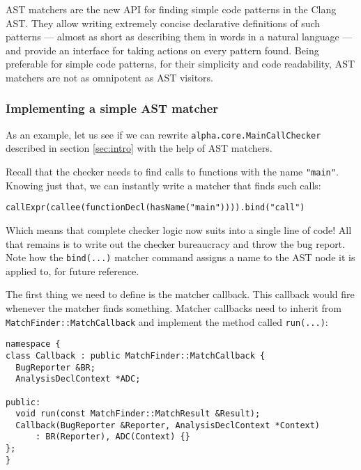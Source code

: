 \documentclass[a4paper,12pt]{article}
\newenvironment{nobr}{\begin{minipage}{\textwidth}\setlength\parskip{1em}
}{\end{minipage}\ignorespacesafterend}
\begin{document}
AST matchers are the new API for finding simple code patterns in the Clang AST. They allow writing extremely concise declarative definitions of such patterns --- almost as short as describing them in words in a natural language --- and provide an interface for taking actions on every pattern found. Being preferable for simple code patterns, for their simplicity and code readability, AST matchers are not as omnipotent as AST visitors.

\subsubsection{Implementing a simple AST matcher}

As an example, let us see if we can rewrite \lstinline|alpha.core.MainCallChecker| described in section \ref{sec:intro} with the help of AST matchers.

\begin{nobr}
Recall that the checker needs to find calls to functions with the name \lstinline|"main"|. Knowing just that, we can instantly write a matcher that finds such calls:

\begin{lstlisting}[style=cplusplus,numbers=none]
callExpr(callee(functionDecl(hasName("main")))).bind("call")
\end{lstlisting}
\end{nobr}

Which means that complete checker logic now suits into a single line of code! All that remains is to write out the checker bureaucracy and throw the bug report. Note how the \lstinline|bind(...)| matcher command assigns a name to the AST node it is applied to, for future reference.

\begin{nobr}
The first thing we need to define is the matcher callback. This  callback would fire whenever the matcher finds something. Matcher callbacks need to inherit from \lstinline|MatchFinder::MatchCallback| and implement the method called \lstinline|run(...)|:
\begin{lstlisting}[style=cplusplus,numbers=none]
namespace {
class Callback : public MatchFinder::MatchCallback {
  BugReporter &BR;
  AnalysisDeclContext *ADC;

public:
  void run(const MatchFinder::MatchResult &Result);
  Callback(BugReporter &Reporter, AnalysisDeclContext *Context)
      : BR(Reporter), ADC(Context) {}
};
}
\end{lstlisting}
\end{nobr}
\end{document}

